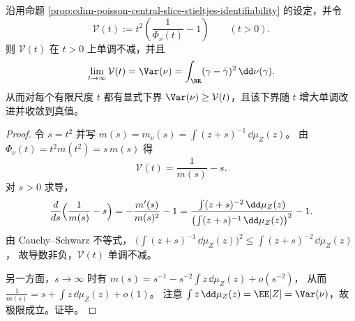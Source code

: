 \begin{proposition}\label{prop:cdim-poisson-variance-monotone-lower-bound}
沿用命题 \ref{prop:cdim-poisson-central-slice-stieltjes-identifiability} 的设定，并令
\[
\mathcal V(t):=t^2\left(\frac{1}{\Phi_\nu(t)}-1\right)
\qquad(t>0).
\]
则 \(\mathcal V(t)\) 在 \(t>0\) 上单调不减，并且
\[
\lim_{t\to\infty}\mathcal V(t)=\Var(\nu)=\int_{\RR}(\gamma-\bar\gamma)^2\,\dd\nu(\gamma).
\]
从而对每个有限尺度 \(t\) 都有显式下界 \(\Var(\nu)\ge \mathcal V(t)\)，且该下界随 \(t\) 增大单调改进并收敛到真值。
\end{proposition}
\begin{proof}
令 \(s=t^2\) 并写 \(m(s)=m_\nu(s)=\int(z+s)^{-1}\,\dd\mu_Z(z)\)。
由 \(\Phi_\nu(t)=t^2 m(t^2)=s\,m(s)\) 得
\[
\mathcal V(t)=\frac{1}{m(s)}-s.
\]
对 \(s>0\) 求导，
\[
\frac{d}{ds}\Bigl(\frac{1}{m(s)}-s\Bigr)
=-\frac{m'(s)}{m(s)^2}-1
=\frac{\int (z+s)^{-2}\,\dd\mu_Z(z)}{\bigl(\int (z+s)^{-1}\,\dd\mu_Z(z)\bigr)^2}-1.
\]
由 Cauchy--Schwarz 不等式，
\(
\bigl(\int (z+s)^{-1}\,\dd\mu_Z(z)\bigr)^2\le \int (z+s)^{-2}\,\dd\mu_Z(z)
\)，
故导数非负，\(\mathcal V(t)\) 单调不减。
\par
另一方面，\(s\to\infty\) 时有
\(
m(s)=s^{-1}-s^{-2}\int z\,\dd\mu_Z(z)+o(s^{-2})
\)，
从而
\(
\frac{1}{m(s)}=s+\int z\,\dd\mu_Z(z)+o(1)
\)。
注意 \(\int z\,\dd\mu_Z(z)=\EE[Z]=\Var(\nu)\)，故极限成立。证毕。
\end{proof}









\endinput

